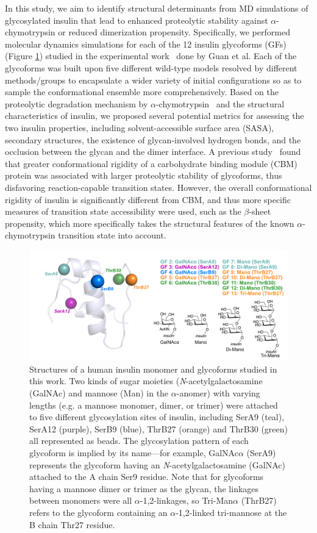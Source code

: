 \documentclass[9pt]{elife}
\begin{document}
In this study, we aim to identify structural determinants from MD simulations of glycosylated insulin that lead to enhanced proteolytic stability against $\alpha$-chymotrypsin or reduced dimerization propensity. Specifically, we performed molecular dynamics simulations for each of the 12 insulin glycoforms (GFs) (Figure \ref{sys_of_interest}) studied in the experimental work~\cite{guan2018chemically} done by Guan et al. Each of the glycoforms was built upon five different wild-type models resolved by different methods/groups to encapsulate a wider variety of initial configurations so as to sample the conformational ensemble more comprehensively. Based on the proteolytic degradation mechanism by $\alpha$-chymotrypsin~\cite{schilling1991degradation} and the structural characteristics of insulin, we proposed several potential metrics for assessing the two insulin properties, including solvent-accessible surface area (SASA), secondary structures, the existence of glycan-involved hydrogen bonds, and the occlusion between the glycan and the dimer interface. A previous study~\cite{chaffey2017structural} found that greater conformational rigidity of a carbohydrate binding module (CBM) protein was associated with larger proteolytic stability of glycoforms, thus disfavoring reaction-capable transition states. However, the overall conformational rigidity of insulin is significantly different from CBM, and thus more specific measures of transition state accessibility were used, such as the $\beta$-sheet propensity, which more specifically takes the structural features of the known $\alpha$-chymotrypsin transition state into account.
\begin{figure}[H]
\centering
\includegraphics[width=\textwidth]{Figures/Fig_glycan_positions.png}
\caption{Structures of a human insulin monomer and glycoforms studied in this work. Two kinds of sugar moieties (\emph{N}-acetylgalactosamine (GalNAc) and mannose (Man) in the $\alpha$-anomer) with varying lengths (e.g. a mannose monomer, dimer, or trimer) were attached to five different glycosylation sites of insulin, including SerA9 (teal), SerA12 (purple), SerB9 (blue), ThrB27 (orange) and ThrB30 (green) all represented as beads. The glycosylation pattern of each glycoform is implied by its name---for example, GalNAc$\alpha$ (SerA9) represents the glycoform having an \emph{N}-acetylgalactosamine (GalNAc) attached to the A chain Ser9 residue. Note that for glycoforms having a mannose dimer or trimer as the glycan, the linkages between monomers were all $\alpha$-1,2-linkages, so Tri-Man$\alpha$ (ThrB27) refers to the glycoform containing an $\alpha$-1,2-linked tri-mannose at the B chain Thr27 residue.}
\label{sys_of_interest}
\end{figure}
\end{document}
